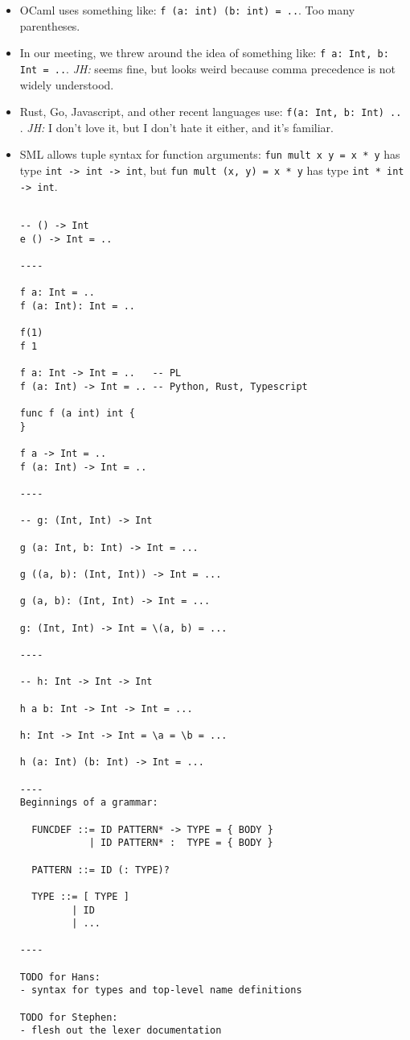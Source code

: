 \documentclass{article}
\begin{document}
\begin{itemize}
  \item OCaml uses something like: \verb|f (a: int) (b: int) = ..|. Too many
    parentheses.

  \item In our meeting, we threw around the idea of something like:
    \verb|f a: Int, b: Int = ..|. \textit{JH:} seems fine, but looks weird because comma
    precedence is not widely understood.

  \item Rust, Go, Javascript, and other recent languages use: \verb|f(a: Int, b: Int) .. |.
    \textit{JH:} I don't love it, but I don't hate it either, and it's familiar.

  \item SML allows tuple syntax for function arguments:
    \verb|fun mult x y = x * y| has type
    \verb|int -> int -> int|,
    but \verb|fun mult (x, y) = x * y| has type
    \verb|int * int -> int|.

\begin{verbatim}

-- () -> Int
e () -> Int = ..

----

f a: Int = ..
f (a: Int): Int = ..

f(1)
f 1

f a: Int -> Int = ..   -- PL
f (a: Int) -> Int = .. -- Python, Rust, Typescript

func f (a int) int {
}

f a -> Int = ..
f (a: Int) -> Int = ..

----

-- g: (Int, Int) -> Int

g (a: Int, b: Int) -> Int = ...

g ((a, b): (Int, Int)) -> Int = ...

g (a, b): (Int, Int) -> Int = ...

g: (Int, Int) -> Int = \(a, b) = ...

----

-- h: Int -> Int -> Int

h a b: Int -> Int -> Int = ...

h: Int -> Int -> Int = \a = \b = ...

h (a: Int) (b: Int) -> Int = ...

----
Beginnings of a grammar:

  FUNCDEF ::= ID PATTERN* -> TYPE = { BODY }
            | ID PATTERN* :  TYPE = { BODY }

  PATTERN ::= ID (: TYPE)?

  TYPE ::= [ TYPE ]
         | ID
         | ...

----

TODO for Hans:
- syntax for types and top-level name definitions

TODO for Stephen:
- flesh out the lexer documentation
\end{verbatim}

\end{itemize}
\end{document}
